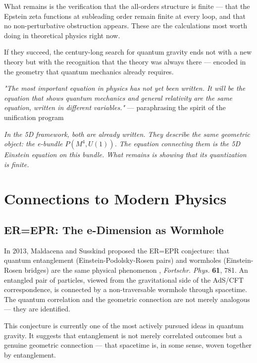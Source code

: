 \documentclass[aps,prd,preprint,superscriptaddress,longbibliography,floatfix]{revtex4-2}
\theoremstyle{remark}
\begin{document}
What remains is the verification that the all-orders structure is finite --- that the Epstein zeta functions at subleading order remain finite at every loop, and that no non-perturbative obstruction appears. These are the calculations most worth doing in theoretical physics right now.

If they succeed, the century-long search for quantum gravity ends not with a new theory but with the recognition that the theory was always there --- encoded in the geometry that quantum mechanics already requires.


\textit{"The most important equation in physics has not yet been written. It will be the equation that shows quantum mechanics and general relativity are the same equation, written in different variables."} --- paraphrasing the spirit of the unification program

\textit{In the 5D framework, both are already written. They describe the same geometric object: the e-bundle $P(M^{4}, U(1))$. The equation connecting them is the 5D Einstein equation on this bundle. What remains is showing that its quantization is finite.}



\section{Connections to Modern Physics}



\subsection{ER=EPR: The e-Dimension as Wormhole}

In 2013, Maldacena and Susskind proposed the ER=EPR conjecture: that quantum entanglement (Einstein-Podolsky-Rosen pairs) and wormholes (Einstein-Rosen bridges) are the same physical phenomenon \cite{MaldacenaSusskind2013}, \textit{Fortschr. Phys.} \textbf{61}, 781. An entangled pair of particles, viewed from the gravitational side of the AdS/CFT correspondence, is connected by a non-traversable wormhole through spacetime. The quantum correlation and the geometric connection are not merely analogous --- they are identified.

This conjecture is currently one of the most actively pursued ideas in quantum gravity. It suggests that entanglement is not merely correlated outcomes but a genuine geometric connection --- that spacetime is, in some sense, woven together by entanglement.
\end{document}
